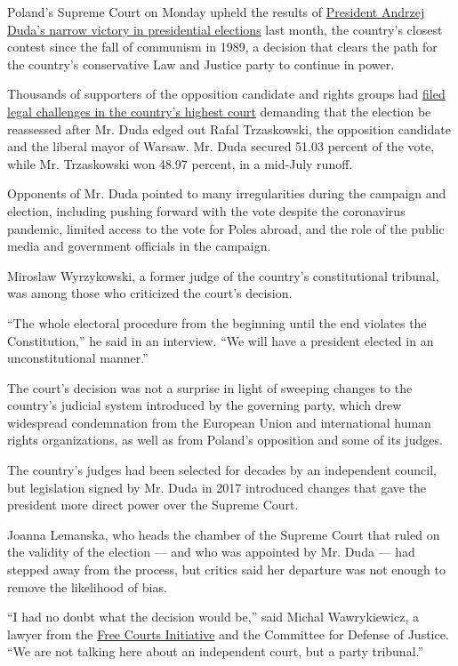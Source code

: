 Poland's Supreme Court on Monday upheld the results of
\href{https://nyti.ms/2DtNZAe}{President Andrzej Duda's narrow victory
in presidential elections} last month, the country's closest contest
since the fall of communism in 1989, a decision that clears the path for
the country's conservative Law and Justice party to continue in power.

Thousands of supporters of the opposition candidate and rights groups
had
\href{https://www.nytimes.com/2020/07/16/world/europe/poland-election.html}{filed
legal challenges in the country's highest court} demanding that the
election be reassessed after Mr. Duda edged out Rafal Trzaskowski, the
opposition candidate and the liberal mayor of Warsaw. Mr. Duda secured
51.03 percent of the vote, while Mr. Trzaskowski won 48.97 percent, in a
mid-July runoff.

Opponents of Mr. Duda pointed to many irregularities during the campaign
and election, including pushing forward with the vote despite the
coronavirus pandemic, limited access to the vote for Poles abroad, and
the role of the public media and government officials in the campaign.

Miroslaw Wyrzykowski, a former judge of the country's constitutional
tribunal, was among those who criticized the court's decision.

``The whole electoral procedure from the beginning until the end
violates the Constitution,'' he said in an interview. ``We will have a
president elected in an unconstitutional manner.''

The court's decision was not a surprise in light of sweeping changes to
the country's judicial system introduced by the governing party, which
drew widespread condemnation from the European Union and international
human rights organizations, as well as from Poland's opposition and some
of its judges.

The country's judges had been selected for decades by an independent
council, but legislation signed by Mr. Duda in 2017 introduced changes
that gave the president more direct power over the Supreme Court.

Joanna Lemanska, who heads the chamber of the Supreme Court that ruled
on the validity of the election --- and who was appointed by Mr. Duda
--- had stepped away from the process, but critics said her departure
was not enough to remove the likelihood of bias.

``I had no doubt what the decision would be,'' said Michal Wawrykiewicz,
a lawyer from the \href{https://www.facebook.com/WolneSady/}{Free Courts
Initiative} and the Committee for Defense of Justice. ``We are not
talking here about an independent court, but a party tribunal.''

